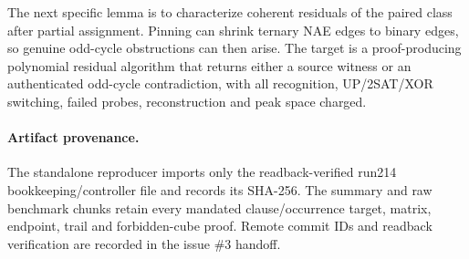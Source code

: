 \documentclass[11pt]{article}
\begin{document}
The next specific lemma is to characterize coherent residuals of the paired
class after partial assignment.  Pinning can shrink ternary NAE edges to
binary edges, so genuine odd-cycle obstructions can then arise.  The target is
a proof-producing polynomial residual algorithm that returns either a source
witness or an authenticated odd-cycle contradiction, with all recognition,
UP/2SAT/XOR switching, failed probes, reconstruction and peak space charged.

\paragraph{Artifact provenance.}
The standalone reproducer imports only the readback-verified run214
bookkeeping/controller file and records its SHA-256.  The summary and raw
benchmark chunks retain every mandated clause/occurrence target, matrix,
endpoint, trail and forbidden-cube proof.  Remote commit IDs and readback
verification are recorded in the issue \#3 handoff.

\end{document}
